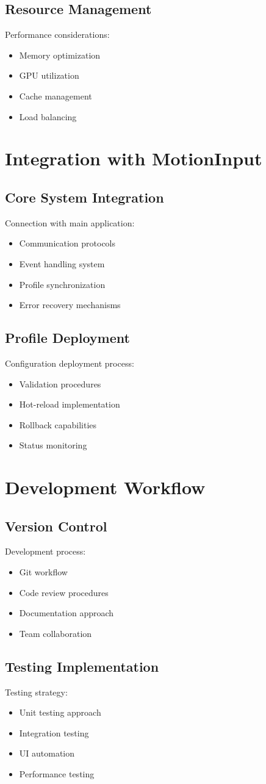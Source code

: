\subsection{Resource Management}
Performance considerations:
\begin{itemize}
    \item Memory optimization
    \item GPU utilization
    \item Cache management
    \item Load balancing
\end{itemize}

\section{Integration with MotionInput}
\subsection{Core System Integration}
Connection with main application:
\begin{itemize}
    \item Communication protocols
    \item Event handling system
    \item Profile synchronization
    \item Error recovery mechanisms
\end{itemize}

\subsection{Profile Deployment}
Configuration deployment process:
\begin{itemize}
    \item Validation procedures
    \item Hot-reload implementation
    \item Rollback capabilities
    \item Status monitoring
\end{itemize}

\section{Development Workflow}
\subsection{Version Control}
Development process:
\begin{itemize}
    \item Git workflow
    \item Code review procedures
    \item Documentation approach
    \item Team collaboration
\end{itemize}

\subsection{Testing Implementation}
Testing strategy:
\begin{itemize}
    \item Unit testing approach
    \item Integration testing
    \item UI automation
    \item Performance testing
\end{itemize}

